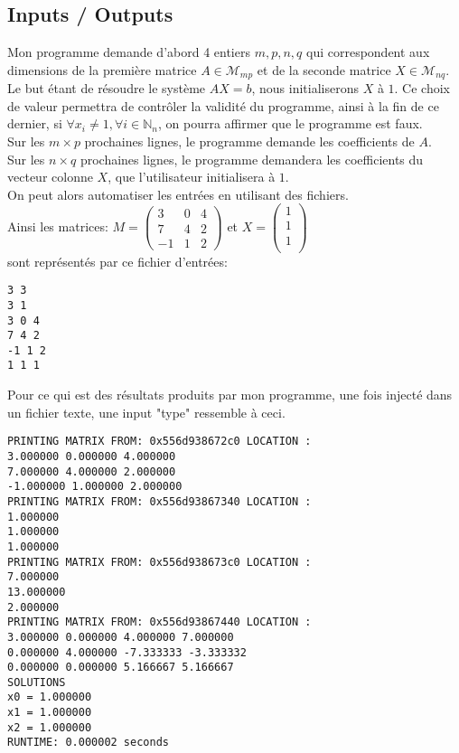 \subsection{Inputs / Outputs}
Mon programme demande d'abord 4 entiers $m,p,n,q$ qui correspondent aux dimensions de la première matrice $A \in \mathcal{M}_{mp}$ et de la seconde matrice $X \in \mathcal{M}_{nq}$. Le but étant de résoudre le système $AX=b$, nous initialiserons $X$ à $1$. Ce choix de valeur permettra de contrôler la validité du programme, ainsi à la fin de ce dernier, si $\forall x_i \neq 1, \forall i \in \mathbb{N}_{n}$, on pourra affirmer que le programme est faux.  \\
Sur les $m\times p$ prochaines lignes, le programme demande les coefficients de $A$. \\
Sur les $n \times q$ prochaines lignes, le programme demandera les coefficients du vecteur colonne $X$, que l'utilisateur initialisera à $1$. \\
On peut alors automatiser les entrées en utilisant des fichiers. \\
Ainsi les matrices:
$ M = \begin{pmatrix}
3 & 0 & 4\\
7 & 4 & 2 \\
-1 & 1 & 2
\end{pmatrix}
$
et 
$ X = \begin{pmatrix}
1 \\
1 \\
1 \\
\end{pmatrix}
$ \\
sont représentés par ce fichier d'entrées:
\begin{lstlisting}[caption=input.txt, basicstyle=\fontsize{8}{10}\selectfont]
3 3
3 1 
3 0 4
7 4 2
-1 1 2
1 1 1
\end{lstlisting}
Pour ce qui est des résultats produits par mon programme, une fois injecté dans un fichier texte, une input "type" ressemble à ceci. \\
\begin{lstlisting}[caption=Gauss elimination with M and X matrix, basicstyle=\fontsize{8}{10}\selectfont]
PRINTING MATRIX FROM: 0x556d938672c0 LOCATION :
3.000000 0.000000 4.000000
7.000000 4.000000 2.000000
-1.000000 1.000000 2.000000
PRINTING MATRIX FROM: 0x556d93867340 LOCATION :
1.000000
1.000000
1.000000
PRINTING MATRIX FROM: 0x556d938673c0 LOCATION :
7.000000
13.000000
2.000000
PRINTING MATRIX FROM: 0x556d93867440 LOCATION :
3.000000 0.000000 4.000000 7.000000
0.000000 4.000000 -7.333333 -3.333332
0.000000 0.000000 5.166667 5.166667
SOLUTIONS
x0 = 1.000000
x1 = 1.000000
x2 = 1.000000
RUNTIME: 0.000002 seconds 
\end{lstlisting}
